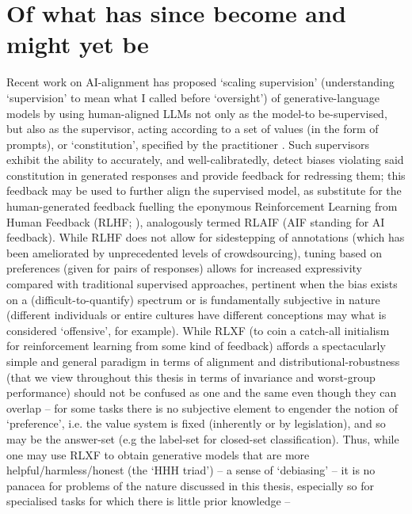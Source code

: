 \section*{Of what has since become and might yet be}
%
%
Recent work on AI-alignment has proposed `scaling supervision' (understanding `supervision' to mean
what I called before `oversight') of generative-language models by using human-aligned LLMs not
only as the model-to be-supervised, but also as the supervisor, acting according to a set of values
(in the form of prompts), or `constitution', specified by the practitioner
\citep{bowman2022measuring, bai2022constitutional}.
%
Such supervisors exhibit the ability to accurately, and well-calibratedly, detect biases violating
said constitution in generated responses and provide feedback for redressing them; this feedback
may be used to further align the supervised model, as substitute for the human-generated feedback
fuelling the eponymous Reinforcement Learning from Human Feedback (RLHF; \cite{christiano2017deep,
stiennon2020learning, bai2022training}), analogously termed RLAIF (AIF standing for AI feedback).
%
While RLHF does not allow for sidestepping of annotations (which has been ameliorated by
unprecedented levels of crowdsourcing), tuning based on preferences (given for pairs of responses)
allows for increased expressivity compared with traditional supervised approaches, pertinent when
the bias exists on a (difficult-to-quantify) spectrum or is fundamentally subjective in nature
(different individuals or entire cultures have different conceptions may what is considered
`offensive', for example).
%
While RLXF (to coin a catch-all initialism for reinforcement learning from some kind of feedback)
affords a spectacularly simple and general paradigm in terms of alignment and
distributional-robustness (that we view throughout this thesis in terms of invariance and
worst-group performance) should not be confused as one and the same even though they can overlap --
for some tasks there is no subjective element to engender the notion of `preference', i.e. the
value system is fixed (inherently or by legislation), and so may be the answer-set (e.g the
label-set for closed-set classification). 
%
Thus, while one may use RLXF to obtain generative models that are more helpful/harmless/honest (the
`HHH triad') -- a sense of `debiasing' -- it is no panacea for problems of the nature discussed in
this thesis, especially so for specialised tasks for which there is little prior knowledge --
